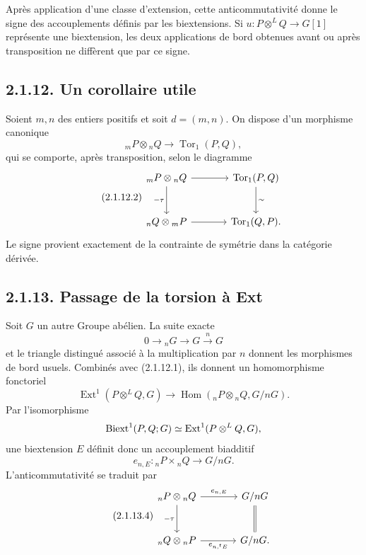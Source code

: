 \documentclass[11pt]{article}
\providecommand{\Tor}{\operatorname{Tor}}
\providecommand{\Hom}{\operatorname{Hom}}
\providecommand{\Ext}{\operatorname{Ext}}
\begin{document}
Après application d'une classe d'extension, cette anticommutativité donne le signe des accouplements définis par les biextensions.  Si \(u:P\otimes^LQ\to G[1]\) représente une biextension, les deux applications de bord obtenues avant ou après transposition ne diffèrent que par ce signe.

\subsection*{2.1.12. Un corollaire utile}

Soient \(m,n\) des entiers positifs et soit \(d=(m,n)\).  On dispose d'un morphisme canonique
\begin{equation}\tag{2.1.12.1}
        {}_mP\otimes {}_nQ\longrightarrow \Tor_1(P,Q),
\end{equation}
qui se comporte, après transposition, selon le diagramme
\begin{equation}\tag{2.1.12.2}
\begin{tikzcd}[column sep=large,row sep=large]
{}_mP\otimes {}_nQ\arrow[r]\arrow[d,"-\tau"']&\Tor_1(P,Q)\arrow[d,"\sim"]\\
{}_nQ\otimes {}_mP\arrow[r]&\Tor_1(Q,P).
\end{tikzcd}
\end{equation}
Le signe provient exactement de la contrainte de symétrie dans la catégorie dérivée.

\subsection*{2.1.13. Passage de la torsion à Ext}

Soit \(G\) un autre Groupe abélien.  La suite exacte
\begin{equation}\tag{2.1.13.1}
        0\longrightarrow {}_nG\longrightarrow G\xrightarrow{n}G
\end{equation}
et le triangle distingué associé à la multiplication par \(n\) donnent les morphismes de bord usuels.  Combinés avec (2.1.12.1), ils donnent un homomorphisme fonctoriel
\begin{equation}\tag{2.1.13.2}
        \Ext^1(P\otimes^LQ,G)\longrightarrow
        \Hom({}_nP\otimes {}_nQ,G/nG).
\end{equation}
Par l'isomorphisme
\[
        \Biext^1(P,Q;G)\simeq\Ext^1(P\otimes^LQ,G),
\]
une biextension \(E\) définit donc un accouplement biadditif
\begin{equation}\tag{2.1.13.3}
        e_{n,E}:{}_nP\times {}_nQ\longrightarrow G/nG.
\end{equation}
L'anticommutativité se traduit par
\begin{equation}\tag{2.1.13.4}
\begin{tikzcd}[column sep=large,row sep=large]
{}_nP\otimes{}_nQ\arrow[r,"e_{n,E}"]\arrow[d,"-\tau"']&G/nG\arrow[d,equal]\\
{}_nQ\otimes{}_nP\arrow[r,"e_{n,{}^{t}E}"']&G/nG .
\end{tikzcd}
\end{equation}
\end{document}
